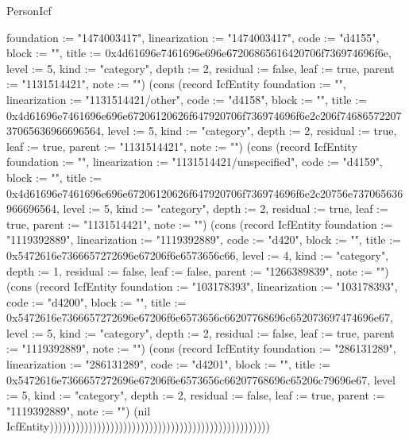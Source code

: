 \begin{lexlean}{PersonIcf}
\begin{semanticmodule}
{{foundation := "1474003417", linearization := "1474003417", code := "d4155", block := "", title := 0x4d61696e7461696e696e67206865616420706f736974696f6e, level := 5, kind := "category", depth := 2, residual := false, leaf := true, parent := "1131514421", note := ""}) (cons (record IcfEntity {foundation := "", linearization := "1131514421/other", code := "d4158", block := "", title := 0x4d61696e7461696e696e67206120626f647920706f736974696f6e2c206f7468657220737065636966696564, level := 5, kind := "category", depth := 2, residual := true, leaf := true, parent := "1131514421", note := ""}) (cons (record IcfEntity {foundation := "", linearization := "1131514421/unspecified", code := "d4159", block := "", title := 0x4d61696e7461696e696e67206120626f647920706f736974696f6e2c20756e737065636966696564, level := 5, kind := "category", depth := 2, residual := true, leaf := true, parent := "1131514421", note := ""}) (cons (record IcfEntity {foundation := "1119392889", linearization := "1119392889", code := "d420", block := "", title := 0x5472616e7366657272696e67206f6e6573656c66, level := 4, kind := "category", depth := 1, residual := false, leaf := false, parent := "1266389839", note := ""}) (cons (record IcfEntity {foundation := "103178393", linearization := "103178393", code := "d4200", block := "", title := 0x5472616e7366657272696e67206f6e6573656c66207768696c652073697474696e67, level := 5, kind := "category", depth := 2, residual := false, leaf := true, parent := "1119392889", note := ""}) (cons (record IcfEntity {foundation := "286131289", linearization := "286131289", code := "d4201", block := "", title := 0x5472616e7366657272696e67206f6e6573656c66207768696c65206c79696e67, level := 5, kind := "category", depth := 2, residual := false, leaf := true, parent := "1119392889", note := ""}) (nil IcfEntity)))))))))))))))))))))))))))))))))))))))))))))))))))
}


\end{semanticmodule}
\end{lexlean}
